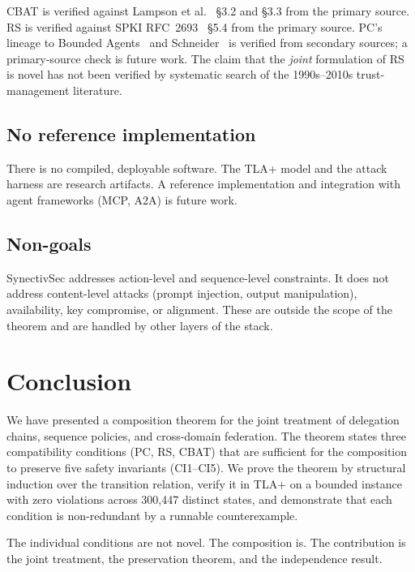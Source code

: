\documentclass[11pt,a4paper]{article}
\theoremstyle{plain}
\theoremstyle{definition}
\theoremstyle{remark}
\begin{document}
CBAT is verified against Lampson et al.~\cite{lampson1992authentication}
\S3.2 and \S3.3 from the primary source. RS is verified against SPKI
RFC~2693~\cite{rfc2693spki} \S5.4 from the primary source. PC's lineage to
Bounded Agents~\cite{boundedagents2026} and Schneider~\cite{schneider2000enforceable}
is verified from secondary sources; a primary-source check is future work.
The claim that the \emph{joint} formulation of RS is novel has not been
verified by systematic search of the 1990s--2010s trust-management literature.

\subsection*{No reference implementation}

There is no compiled, deployable software. The TLA+ model and the attack
harness are research artifacts. A reference implementation and integration
with agent frameworks (MCP, A2A) is future work.

\subsection*{Non-goals}

SynectivSec addresses action-level and sequence-level constraints. It does not
address content-level attacks (prompt injection, output manipulation),
availability, key compromise, or alignment. These are outside the scope of the
theorem and are handled by other layers of the stack.

\section{Conclusion}
\label{sec:conclusion}

We have presented a composition theorem for the joint treatment of delegation
chains, sequence policies, and cross-domain federation. The theorem states
three compatibility conditions (PC, RS, CBAT) that are sufficient for the
composition to preserve five safety invariants (CI1--CI5). We prove the
theorem by structural induction over the transition relation, verify it in
TLA+ on a bounded instance with zero violations across 300{,}447 distinct
states, and demonstrate that each condition is non-redundant by a runnable
counterexample.

The individual conditions are not novel. The composition is. The contribution
is the joint treatment, the preservation theorem, and the independence result.
\end{document}
